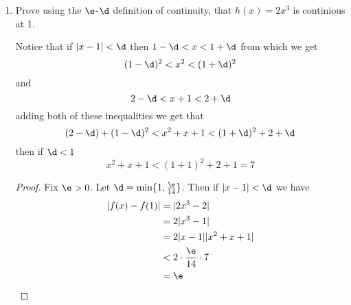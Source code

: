 \documentclass[11pt]{exam}
\begin{document}
    \begin{enumerate}
        \item Prove using the $\e$-$\d$ definition of continuity, that $h(x) = 2x^3$ is continious at 1.
            \begin{solution}
                Notice that  if $|x-1|<\d$ then 
                $1-\d < x < 1 + \d$ from which we get 
                $$(1-\d)^2 < x^2  < (1+\d)^2$$ and $$2-\d < x+1 < 2 + \d$$ adding both of these inequalities we get that 
                $$(2-\d)+(1-\d)^2 < x^2 + x + 1 < (1+\d)^2 + 2 + \d$$
                then if $\d < 1$
                $$x^2 + x + 1 < (1+1)^2 + 2 + 1 = 7$$

                \begin{proof}
                    Fix $\e > 0$. Let $\d = \min\{1, \frac{\e}{14}\}$. Then if $|x-1| < \d$ we have
                    \begin{align*}
                        |f(x)-f(1)| &= |2x^3-2|\\ &= 2|x^3-1|\\ &= 2|x-1||x^2+x+1| \\
                                                          &< 2 \cdot \frac{\e}{14} \cdot 7 \\
                                                          &= \e
                    \end{align*}
                \end{proof}


\end{solution}
\end{enumerate}
\end{document}
